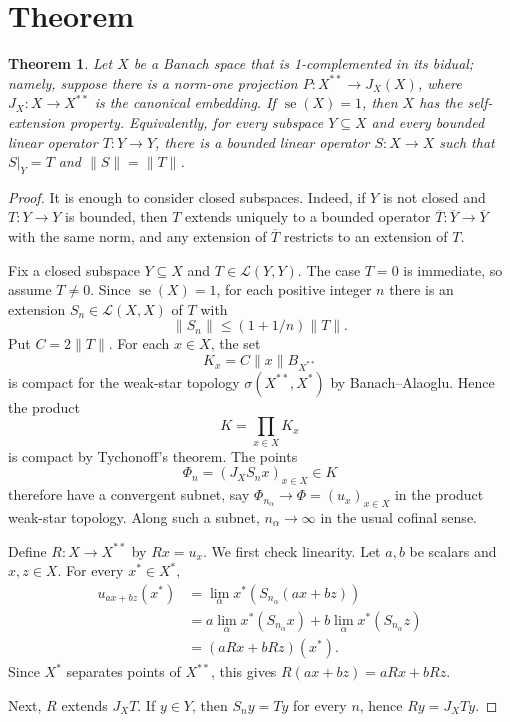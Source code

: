\documentclass[11pt]{article}
\newtheorem{theorem}{Theorem}
\DeclareMathOperator{\se}{se}
\begin{document}
\section*{Theorem}

\begin{theorem}
Let $X$ be a Banach space that is 1-complemented in its bidual; namely, suppose
there is a norm-one projection $P:X^{**}\to J_X(X)$, where
$J_X:X\to X^{**}$ is the canonical embedding. If $\se(X)=1$, then $X$ has the
self-extension property. Equivalently, for every subspace $Y\subseteq X$ and
every bounded linear operator $T:Y\to Y$, there is a bounded linear operator
$S:X\to X$ such that $S|_Y=T$ and $\|S\|=\|T\|$.
\end{theorem}

\begin{proof}
It is enough to consider closed subspaces. Indeed, if $Y$ is not closed and
$T:Y\to Y$ is bounded, then $T$ extends uniquely to a bounded operator
$\overline T:\overline Y\to \overline Y$ with the same norm, and any extension
of $\overline T$ restricts to an extension of $T$.

Fix a closed subspace $Y\subseteq X$ and $T\in\mathcal L(Y,Y)$. The case
$T=0$ is immediate, so assume $T\neq 0$. Since $\se(X)=1$, for each positive
integer $n$ there is an extension $S_n\in\mathcal L(X,X)$ of $T$ with
\[
  \|S_n\|\leq (1+1/n)\|T\|.
\]
Put $C=2\|T\|$. For each $x\in X$, the set
\[
  K_x=C\|x\| B_{X^{**}}
\]
is compact for the weak-star topology $\sigma(X^{**},X^*)$ by
Banach--Alaoglu. Hence the product
\[
  K=\prod_{x\in X} K_x
\]
is compact by Tychonoff's theorem. The points
\[
  \Phi_n=(J_XS_nx)_{x\in X}\in K
\]
therefore have a convergent subnet, say $\Phi_{n_\alpha}\to \Phi=(u_x)_{x\in X}$
in the product weak-star topology. Along such a subnet, $n_\alpha\to\infty$ in
the usual cofinal sense.

Define $R:X\to X^{**}$ by $Rx=u_x$. We first check linearity. Let $a,b$ be scalars
and $x,z\in X$. For every $x^*\in X^*$,
\[
\begin{aligned}
  u_{ax+bz}(x^*)
  &=\lim_\alpha x^*(S_{n_\alpha}(ax+bz)) \\
  &=a\lim_\alpha x^*(S_{n_\alpha}x)
    +b\lim_\alpha x^*(S_{n_\alpha}z) \\
  &=(aRx+bRz)(x^*).
\end{aligned}
\]
Since $X^*$ separates points of $X^{**}$, this gives
$R(ax+bz)=aRx+bRz$.

Next, $R$ extends $J_XT$. If $y\in Y$, then $S_ny=Ty$ for every $n$, hence
$Ry=J_XTy$.


\end{proof}
\end{document}
